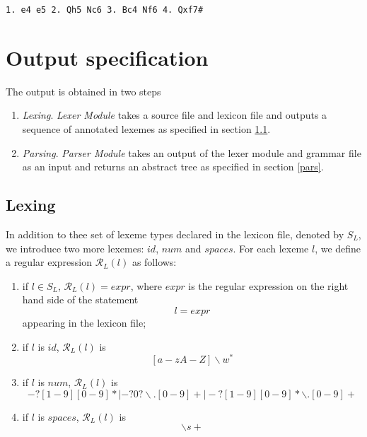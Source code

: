 \documentclass[a4paper,10pt]{article}
\newcounter{subsubsubsection}[subsubsection]
\begin{document}
\label{csf}
\begin{comment}
\begin{verbatim}

1. e4 c5 2. Nf3 d6 3. Bb5 Bd7 4. Bxd7 Qxd7 5. c4 Nc6 6. Nc3 Nf6 
7. 0-0 g6 8. d4 cxd4 9. Nxd4 Bg7 10. Nde2 Qe6  11. Nd5 Qxe4 
12. Nc7+ Kd7 13. Nxa8 Qxc4 14. Nb6+ axb6 15. Nc3 Ra8 16. a4 Ne4 
17. Nxe4 Qxe4 18. Qb3 f5 19. Bg5 Qb4 20. Qf7 Be5 21. h3 Rxa4 
22. Rxa4 Qxa4 23. Qxh7 Bxb2 24. Qxg6 Qe4 25. Qf7 Bd4 26. Qb3 f4 
27. Qf7 Be5 28. h4 b5 29. h5 Qc4 30. Qf5+ Qe6 31. Qxe6+ Kxe6 
32. g3 fxg3 33. fxg3 b4 34. Bf4 Bd4 
35. Kh1! b3 36. g4 Kd5 37. g5 e6 38. h6 Ne7 39. Rd1 e5 40. Be3 Kc4 
41. Bxd4 exd4 42. Kg2 b2 43. Kf3 Kc3 44. h7 Ng6 45. Ke4 Kc2 
46. Rh1 d3 47. Kf5 b1=Q 48. Rxb1 Kxb1 49. Kxg6 d2 50. h8=Q d1=Q 
51. Qh7 b5 52. Kf6 Kb2 53. Qh2 Ka1 54. Qf4 b4 55. Qxb4 Qf3+ 
56. Kg7 d5 57. Qd4 Kb1 58. g6 Qe4 59. Qg1 Kb2 60. Qf2+ Kc1 
61. Kf6 d4 62. g7 1-0 
\end{verbatim}
\end{comment}

\begin{verbatim}
1. e4 e5 2. Qh5 Nc6 3. Bc4 Nf6 4. Qxf7# 
\end{verbatim}

\section{Output specification}
The output is obtained in two steps
\begin{enumerate}
\item \textit{Lexing}.  \textit{Lexer Module} takes a source file and lexicon file and outputs a sequence of annotated lexemes as specified in section \ref{lex}.
\item \textit{Parsing}. \textit{Parser Module} takes an output of the lexer module and grammar file as an input and returns an abstract tree as specified in section \ref{pars}.
\end{enumerate}

\subsection{Lexing}\label{lex}
In addition to thee  set of lexeme types  declared in the lexicon file, denoted by $S_L$, we introduce two more lexemes: $id$, $num$ and $spaces$.  For each lexeme $l$, we define a regular expression $\mathcal{R}_L(l)$ as follows:

\begin{enumerate}
\item if $l \in S_L$, $\mathcal{R}_L(l) = expr$, where $expr$ is the regular expression  on the right hand side of the statement
$$l = expr$$
appearing in the lexicon file;
\item if $l$ is $id$, $\mathcal{R}_L(l)$ is 
                               $$[a-zA-Z]\backslash w^*$$
\item if $l$ is $num$, $\mathcal{R}_L(l)$ is  
                $$-?[1-9][0-9]* |-?0?\backslash.[0-9]+ | -?[1-9][0-9]*\backslash.[0-9]+$$ 
\item if $l$ is $spaces$, $\mathcal{R}_L(l)$ is  
                $$\backslash s+$$ 
\end{enumerate}
\end{document}
